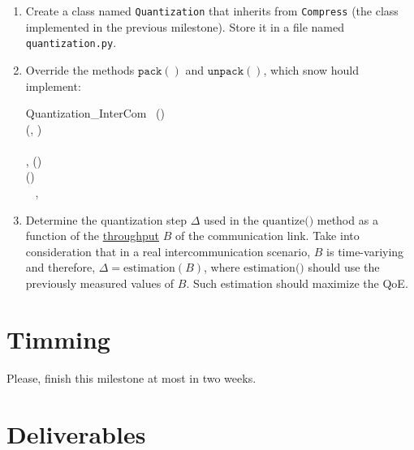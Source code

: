 \begin{enumerate}
\item Create a class named \texttt{Quantization} that inherits from
  \texttt{Compress} (the class implemented in the previous
  milestone). Store it in a file named \texttt{quantization.py}.
  
\item Override the methods $\mathtt{pack()}$ and $\mathtt{unpack()}$,
  which snow hould implement:

\begin{pseudocode}{Quantization\_InterCom}{~}
  \BEGIN
     \GETS {}()\\
     \GETS {}(, )\\
    ~ \\
  \END
  \ENDPROCEDURE
  \BEGIN
    ,  \GETS {}()\\
     \GETS {}()\\
    ~ , 
  \END
  \ENDPROCEDURE
\end{pseudocode}

\item Determine the quantization step $\Delta$ used in the
  $\text{quantize()}$ method as a function of the
  \href{https://en.wikipedia.org/wiki/Throughput}{throughput} $B$ of
  the communication link. Take into consideration that in a real
  intercommunication scenario, $B$ is time-variying and therefore,
  $\Delta = \text{estimation}(B)$, where $\text{estimation()}$
  should use the previously measured values of $B$. Such estimation
  should maximize the QoE.
\end{enumerate}

\section{Timming}

Please, finish this milestone at most in two weeks.

\section{Deliverables}

